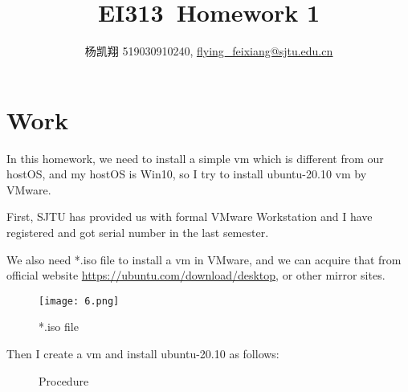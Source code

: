 \documentclass[UTF8,12pt]{ctexart}
\title{\heiti \textbf{EI313\ Homework 1}}
\author{\kaishu 杨凯翔 519030910240, \href{mailto: flying_feixiang@sjtu.edu.cn}{\underline{flying\_feixiang@sjtu.edu.cn}}}
\numberwithin{equation}{section}
\begin{document}
\maketitle

\thispagestyle{fancy}
\fancyhead{}
\lfoot{}
\rfoot{\thepage}
\renewcommand{\headrulewidth}{0.4pt}
\renewcommand{\footrulewidth}{0.4pt}

\heiti
\section{Work}
In this homework, we need to install a simple vm which is different from our hostOS, and my hostOS is Win10, so I try to install ubuntu-20.10 vm by VMware.

First, SJTU has provided us with formal VMware Workstation and I have registered and got serial number in the last semester.

We also need *.iso file to install a vm in VMware, and we can acquire that from official website
\url{https://ubuntu.com/download/desktop}, or other mirror sites.
\begin{figure}[H]
    \centering
    \texttt{[image: 6.png]}
    \caption{*.iso file}
\end{figure}
Then I create a vm and install ubuntu-20.10 as follows:
\begin{figure}[H]
    \centering
    \centering
    \caption{Procedure}
\end{figure}
\end{document}

